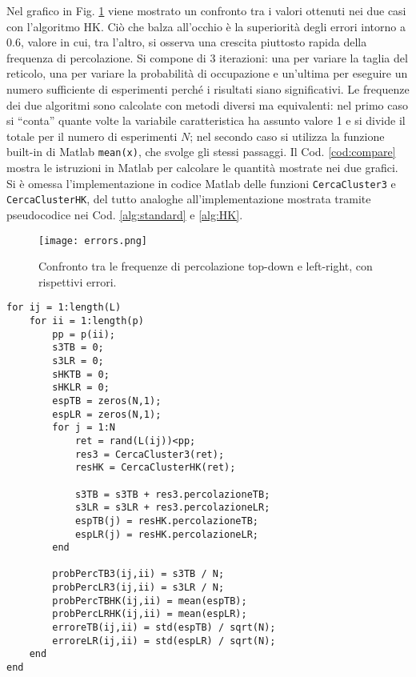 Nel grafico in Fig. \ref{fig:th_errors} viene mostrato un confronto tra i valori 
ottenuti nei due casi con l'algoritmo HK. Ciò che balza all'occhio è la 
superiorità degli errori intorno a $0.6$, valore in cui, tra l'altro, 
si osserva una crescita piuttosto rapida della frequenza di percolazione.
Si compone di 3 iterazioni: una per variare la 
taglia del reticolo, una per variare la probabilità di occupazione e un'ultima per 
eseguire un numero sufficiente di esperimenti perché i risultati siano significativi.
Le frequenze dei due algoritmi sono calcolate con metodi diversi ma equivalenti:
nel primo caso si ``conta'' quante volte la variabile caratteristica ha assunto valore 1
e si divide il totale per il numero di esperimenti $N$; nel secondo caso si utilizza la 
funzione built-in di Matlab \texttt{mean(x)}, che svolge gli stessi passaggi.
Il Cod. \ref{cod:compare} mostra le istruzioni in Matlab per calcolare le quantità 
mostrate nei due grafici. Si è omessa l'implementazione in codice Matlab delle funzioni 
\texttt{CercaCluster3} e \texttt{CercaClusterHK}, del tutto analoghe all'implementazione 
mostrata tramite pseudocodice nei Cod. \ref{alg:standard} e \ref{alg:HK}. \\


\begin{figure}[ht]
    \texttt{[image: errors.png]}
    \caption{Confronto tra le frequenze di percolazione top-down e left-right,
    con rispettivi errori.}
    \label{fig:th_errors}
\end{figure}
\begin{lstlisting}[caption={Porzione di codice relativa al confronto tra algoritmi e 
    alla frequenza di percolazione top-down e left-right.}, label={cod:compare}]
for ij = 1:length(L)
    for ii = 1:length(p)
        pp = p(ii);
        s3TB = 0;
        s3LR = 0;
        sHKTB = 0;
        sHKLR = 0;
        espTB = zeros(N,1);
        espLR = zeros(N,1);
        for j = 1:N
            ret = rand(L(ij))<pp;
            res3 = CercaCluster3(ret);
            resHK = CercaClusterHK(ret);

            s3TB = s3TB + res3.percolazioneTB;
            s3LR = s3LR + res3.percolazioneLR;
            espTB(j) = resHK.percolazioneTB;
            espLR(j) = resHK.percolazioneLR;
        end

        probPercTB3(ij,ii) = s3TB / N;
        probPercLR3(ij,ii) = s3LR / N;
        probPercTBHK(ij,ii) = mean(espTB);
        probPercLRHK(ij,ii) = mean(espLR);
        erroreTB(ij,ii) = std(espTB) / sqrt(N);
        erroreLR(ij,ii) = std(espLR) / sqrt(N);
    end
end
\end{lstlisting}

